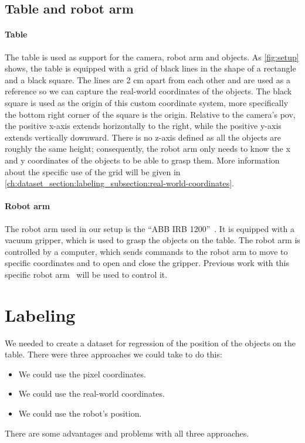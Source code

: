 \subsection{Table and robot arm}\label{ch:dataset_section:setup_subsection:table-and-robot-arm}
\paragraph{Table}
The table is used as support for the camera, robot arm and objects.
As \cref{fig:setup} shows, the table is equipped with a grid of black lines in the shape of a rectangle and a black square.
The lines are 2 cm apart from each other and are used as a reference so we can capture the real-world coordinates of the objects.
The black square is used as the origin of this custom coordinate system, more specifically the bottom right corner of the square is the origin.
Relative to the camera's \gls{pov}, the positive x-axis extends horizontally to the right, while the positive y-axis extends vertically downward.
There is no z-axis defined as all the objects are roughly the same height; consequently, the robot arm only needs to know the x and y coordinates of the objects to be able to grasp them.
More information about the specific use of the grid will be given in \cref{ch:dataset_section:labeling_subsection:real-world-coordinates}.

\paragraph{Robot arm}
The robot arm used in our setup is the ``ABB IRB 1200''~\cite{src:ABB-IRB1200}.
It is equipped with a vacuum gripper, which is used to grasp the objects on the table.
The robot arm is controlled by a computer, which sends commands to the robot arm to move to specific coordinates and to open and close the gripper.
Previous work with this specific robot arm~\cite{src:robot-demonstrator} will be used to control it.

\section{Labeling}\label{ch:dataset_section:labeling}
We needed to create a dataset for regression of the position of the objects on the table.
There were three approaches we could take to do this:
\begin{itemize}
    \item We could use the pixel coordinates. 
    \item We could use the real-world coordinates.
    \item We could use the robot's position.
\end{itemize}
There are some advantages and problems with all three approaches.

